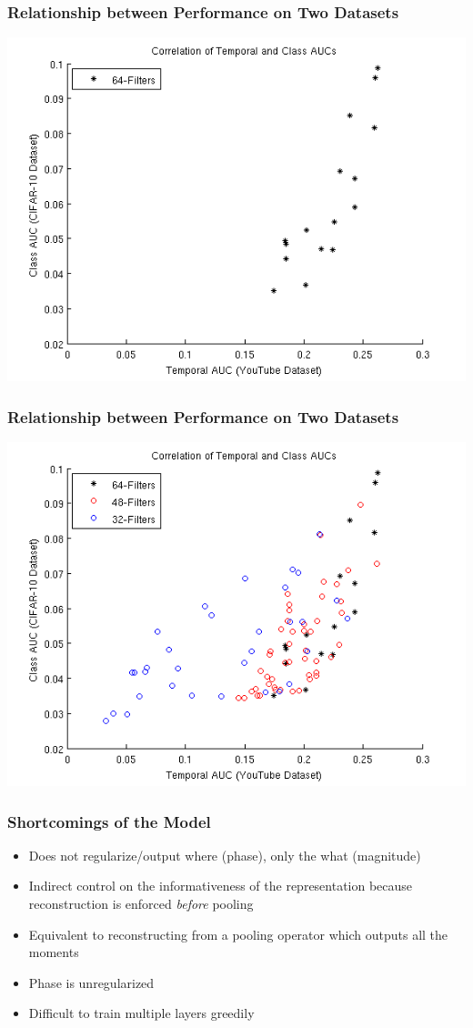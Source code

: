 \documentclass{beamer}
\begin{document}
\begin{frame}
\frametitle{Relationship between Performance on Two Datasets} 
\centerline{\includegraphics[scale=0.55]{./images/TAE/AUC_64.png}}
\end{frame}

\begin{frame}
\frametitle{Relationship between Performance on Two Datasets} 
\centerline{\includegraphics[scale=0.55]{./images/TAE/AUC_all.png}}
\end{frame}

\begin{frame}
\frametitle{Shortcomings of the Model} 
\begin{itemize} 
\item Does not regularize/output where (phase), only the what (magnitude) 
\item Indirect control on the informativeness of the representation because reconstruction is enforced \emph{before} pooling 
\item Equivalent to reconstructing from a pooling operator which outputs all the moments
\item Phase is unregularized    
\item Difficult to train multiple layers greedily  
\end{itemize} 
\end{frame}
\end{document}
